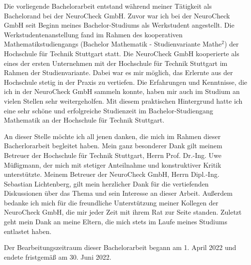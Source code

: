 Die vorliegende Bachelorarbeit entstand während meiner Tätigkeit als Bachelorand bei der NeuroCheck GmbH.
Zuvor war ich bei der NeuroCheck GmbH seit Beginn meines Bachelor-Studiums als Werkstudent angestellt.
Die Werkstudentenanstellung fand im Rahmen des kooperativen Mathematikstudiengangs (Bachelor Mathematik - Studienvariante \glqq Mathe$^2$\grqq) der Hochschule für Technik Stuttgart statt.
Die NeuroCheck GmbH kooperierte als eines der ersten Unternehmen mit der Hochschule für Technik Stuttgart im Rahmen der Studienvariante.
Dabei war es mir möglich, das Erlernte aus der Hochschule stetig in der Praxis zu vertiefen.
Die Erfahrungen und Kenntnisse, die ich in der NeuroCheck GmbH sammeln konnte, haben mir auch im Studium an vielen Stellen sehr weitergeholfen.
Mit diesem praktischen Hintergrund hatte ich eine sehr schöne und erfolgreiche Studienzeit im Bachelor-Studiengang Mathematik an der Hochschule für Technik Stuttgart.

\p
An dieser Stelle möchte ich all jenen danken, die mich im Rahmen dieser Bacherlorarbeit begleitet haben.
Mein ganz besonderer Dank gilt meinem Betreuer der Hochschule für Technik Stuttgart, Herrn Prof. Dr.-Ing. Uwe Müßigmann, der mich mit stetiger Anteilnahme und konstruktiver Kritik unterstützte.
Meinem Betreuer der NeuroCheck GmbH, Herrn Dipl.-Ing. Sebastian Lichtenberg, gilt mein herzlicher Dank für die vertiefenden Diskussionen über das Thema und sein Interesse an dieser Arbeit.
Außerdem bedanke ich mich für die freundliche Unterstützung meiner Kollegen der NeuroCheck GmbH, die mir jeder Zeit mit ihrem Rat zur Seite standen.
Zuletzt geht mein Dank an meine Eltern, die mich stets im Laufe meines Studiums entlastet haben.

\p
Der Bearbeitungszeitraum dieser Bachelorarbeit begann am 1. April 2022 und endete fristgemäß am 30. Juni 2022.